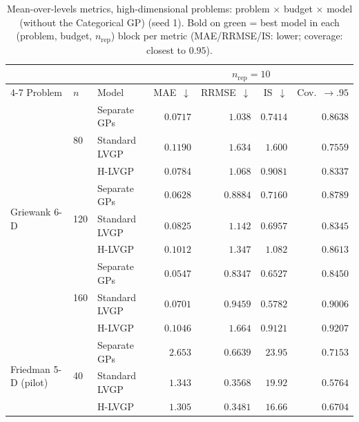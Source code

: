 \begin{table}[htbp]
\centering
\small
\setlength{\tabcolsep}{3.5pt}
\setlength{\fboxsep}{1.5pt}
\caption{Mean-over-levels metrics, high-dimensional problems: problem $\times$ budget $\times$ model (without the Categorical GP) (seed 1). Bold on green = best model in each (problem, budget, $n_{\mathrm{rep}}$) block per metric (MAE/RRMSE/IS: lower; coverage: closest to $0.95$).}
\label{tab:summary_hd_nocat}
\begin{tabular}{lllrrrr}
\toprule
 & & & \multicolumn{4}{c}{$n_{\mathrm{rep}}=10$} \\
\cmidrule(lr){4-7}
Problem & $n$ & Model & MAE~$\downarrow$ & RRMSE~$\downarrow$ & IS~$\downarrow$ & Cov.~$\to.95$ \\
\midrule
\multirow{9}{*}{Griewank 6-D} & \multirow{3}{*}{80} & Separate GPs & \colorbox{green!20}{\boldmath$0.0717$} & \colorbox{green!20}{\boldmath$1.038$} & \colorbox{green!20}{\boldmath$0.7414$} & \colorbox{green!20}{\boldmath$0.8638$} \\
 &  & Standard LVGP & $0.1190$ & $1.634$ & $1.600$ & $0.7559$ \\
 &  & H-LVGP & $0.0784$ & $1.068$ & $0.9081$ & $0.8337$ \\
\cmidrule(lr){2-7}
 & \multirow{3}{*}{120} & Separate GPs & \colorbox{green!20}{\boldmath$0.0628$} & \colorbox{green!20}{\boldmath$0.8884$} & $0.7160$ & \colorbox{green!20}{\boldmath$0.8789$} \\
 &  & Standard LVGP & $0.0825$ & $1.142$ & \colorbox{green!20}{\boldmath$0.6957$} & $0.8345$ \\
 &  & H-LVGP & $0.1012$ & $1.347$ & $1.082$ & $0.8613$ \\
\cmidrule(lr){2-7}
 & \multirow{3}{*}{160} & Separate GPs & \colorbox{green!20}{\boldmath$0.0547$} & \colorbox{green!20}{\boldmath$0.8347$} & $0.6527$ & $0.8450$ \\
 &  & Standard LVGP & $0.0701$ & $0.9459$ & \colorbox{green!20}{\boldmath$0.5782$} & $0.9006$ \\
 &  & H-LVGP & $0.1046$ & $1.664$ & $0.9121$ & \colorbox{green!20}{\boldmath$0.9207$} \\
\midrule
\multirow{9}{*}{Friedman 5-D (pilot)} & \multirow{3}{*}{40} & Separate GPs & $2.653$ & $0.6639$ & $23.95$ & \colorbox{green!20}{\boldmath$0.7153$} \\
 &  & Standard LVGP & $1.343$ & $0.3568$ & $19.92$ & $0.5764$ \\
 &  & H-LVGP & \colorbox{green!20}{\boldmath$1.305$} & \colorbox{green!20}{\boldmath$0.3481$} & \colorbox{green!20}{\boldmath$16.66$} & $0.6704$ \\

\end{tabular}
\end{table}
